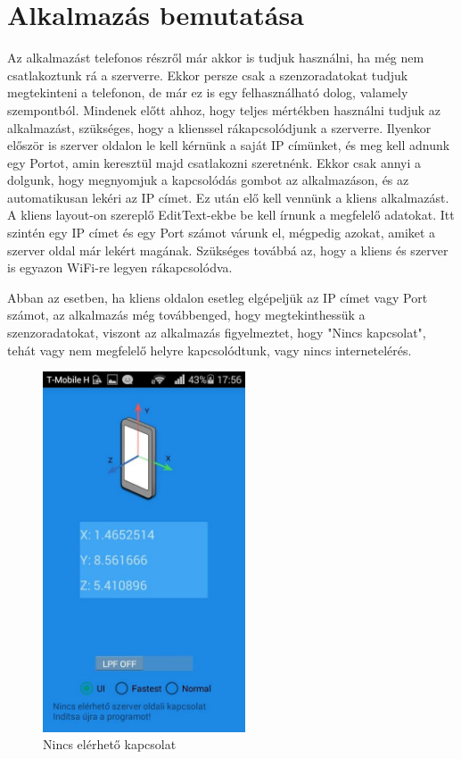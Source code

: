 \documentclass{thesis-ekf}
\theoremstyle{definition}
\theoremstyle{remark}
\begin{document}
\chapter{Alkalmazás bemutatása}
Az alkalmazást telefonos részről már akkor is tudjuk használni, ha még nem csatlakoztunk rá a szerverre. Ekkor persze csak a szenzoradatokat tudjuk megtekinteni a telefonon, de már ez is egy felhasználható dolog, valamely szempontból. Mindenek előtt ahhoz, hogy teljes mértékben használni tudjuk az alkalmazást, szükséges, hogy a klienssel rákapcsolódjunk a szerverre. Ilyenkor először is szerver oldalon le kell kérnünk a saját IP címünket, és meg kell adnunk egy Portot, amin keresztül majd csatlakozni szeretnénk. Ekkor csak annyi a dolgunk, hogy megnyomjuk a kapcsolódás gombot az alkalmazáson, és az automatikusan lekéri az IP címet. Ez után elő kell vennünk a kliens alkalmazást. A kliens layout-on szereplő EditText-ekbe be kell írnunk a megfelelő adatokat. Itt szintén egy IP címet és egy Port számot várunk el, mégpedig azokat, amiket a szerver oldal már lekért magának. Szükséges továbbá az, hogy a kliens és szerver is egyazon WiFi-re legyen rákapcsolódva.
\par Abban az esetben, ha kliens oldalon esetleg elgépeljük az IP címet vagy Port számot, az alkalmazás még továbbenged, hogy megtekinthessük a szenzoradatokat, viszont az alkalmazás figyelmeztet, hogy "Nincs kapcsolat", tehát vagy nem megfelelő helyre kapcsolódtunk, vagy nincs internetelérés. 
\begin{figure}[!h]
	\centering
	\includegraphics[width=6cm]{nincskapcsolat}
	\caption{Nincs elérhető kapcsolat}\label{nincskapcsolat}
\end{figure}
\end{document}
